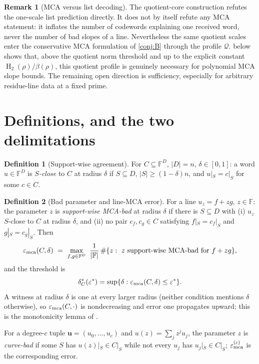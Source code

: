\documentclass[11pt]{article}
\theoremstyle{definition}
\newtheorem{definition}[definition]{Definition}
\newtheorem{remark}[remark]{Remark}
\newcommand{\F}{\mathbb F}
\newcommand{\eps}{\varepsilon}
\newcommand{\HH}{\operatorname{H}_2}
\newcommand{\emca}{\eps_{\rm mca}}
\begin{document}
\begin{remark}[MCA versus list decoding]\label{rem:mcalist}
The quotient-core construction refutes the one-scale list prediction directly.  It does not by itself refute any MCA statement: it inflates the number of codewords explaining one received word, never the number of bad slopes of a line.  Nevertheless the same quotient scales enter the conservative MCA formulation of \cref{conj:B} through the profile $\mathcal Q$.   below shows that, above the quotient norm threshold and up to the explicit constant $\HH(\rho)/\beta(\rho)$, this quotient profile is genuinely necessary for polynomial MCA slope bounds.  The remaining open direction is sufficiency, especially for arbitrary residue-line data at a fixed prime.
\end{remark}

\section{Definitions, and the two delimitations}\label{sec:noslack}

\begin{definition}[Support-wise agreement]\label{def:sclose}
For $C\subseteq\F^D$, $|D|=n$, $\delta\in[0,1]$: a word $u\in\F^D$ is \emph{$S$-close} to $C$ at radius $\delta$ if $S\subseteq D$, $|S|\ge(1-\delta)n$, and $u|_S=c|_S$ for some $c\in C$.
\end{definition}

\begin{definition}[Bad parameter and line-MCA error]\label{def:mca}
For a line $u_z=f+zg$, $z\in\F$: the parameter $z$ is \emph{support-wise MCA-bad} at radius $\delta$ if there is $S\subseteq D$ with (i) $u_z$ $S$-close to $C$ at radius $\delta$, and (ii) no pair $c_f,c_g\in C$ satisfying $f|_S=c_f|_S$ and $g|_S=c_g|_S$.  Then
\[
        \emca(C,\delta)\ =\ \max_{f,g\in\F^D}\ \frac1{|\F|}\,\#\{z:\ z\text{ support-wise MCA-bad for }f+zg\},
\]
and the threshold is
\[
        \delta^*_C(\eps^*)=\sup\{\delta:\emca(C,\delta)\le\eps^*\}.
\]
A witness at radius $\delta$ is one at every larger radius (neither condition mentions $\delta$ otherwise), so $\emca(C,\cdot)$ is nondecreasing and error one propagates upward; this is the monotonicity lemma of \cite{NoSlack}.
\end{definition}

For a degree-$c$ tuple $\mathbf u=(u_0,\dots,u_c)$ and $u(z)=\sum_jz^ju_j$, the parameter $z$ is \emph{curve-bad} if some $S$ has $u(z)|_S\in C|_S$ while not every $u_j$ has $u_j|_S\in C|_S$; $\eps^{(c)}_{\rm mca}$ is the corresponding error.
\end{document}
